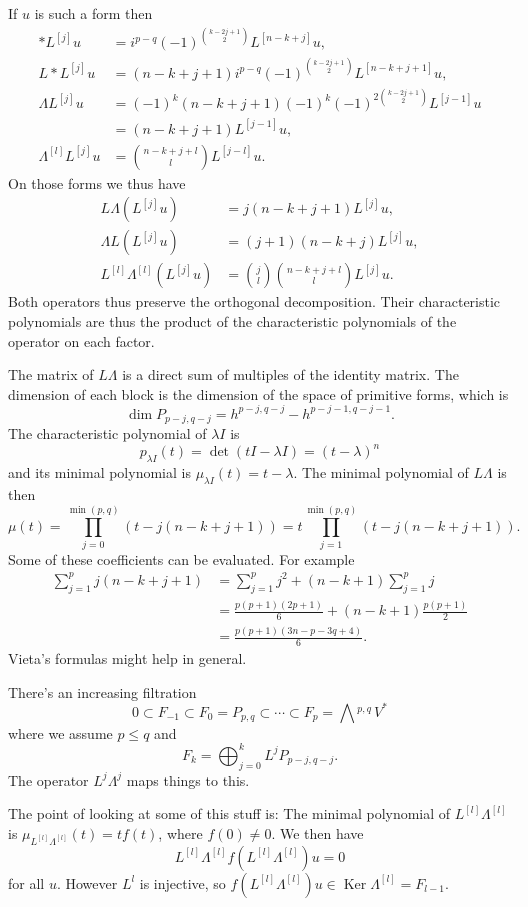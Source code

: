 \documentclass[11pt]{amsart}
\theoremstyle{definition}
\def\^#1{^{[#1]}}
\DeclareMathOperator{\Ker}{Ker}
\newcommand{\ext}[1]{\bigwedge{}^{\!\!#1}\,}
\begin{document}
If $u$ is such a form then
\begin{align*}
* L\^{j} u
&= i^{p-q} (-1)^{\binom{k-2j+1}{2}} L\^{n-k+j} u,
\\
L * L\^{j} u
&= (n-k+j+1) i^{p-q} (-1)^{\binom{k-2j+1}{2}} L\^{n-k+j+1} u,
\\
\Lambda L\^{j} u
&= (-1)^k (n-k+j+1) (-1)^k (-1)^{2 \binom{k-2j+1}{2}} L\^{j-1} u
\\
&= (n-k+j+1) L\^{j-1} u,
\\
\Lambda\^{l} L\^{j} u
&= \binom{n-k+j+l}{l} L\^{j-l} u.
\end{align*}
On those forms we thus have
\begin{align*}
L\Lambda(L\^j u)
&= j (n-k+j+1) L\^j u,
\\
\Lambda L (L\^j u)
&= (j+1) (n-k+j) L\^j u,
\\
L\^l \Lambda\^l (L\^j u)
&= \binom{j}{l} \binom{n-k+j+l}{l} L\^j u.
\end{align*}
Both operators thus preserve the orthogonal decomposition.
Their characteristic polynomials are thus the product of the characteristic
polynomials of the operator on each factor.

The matrix of $L\Lambda$ is a direct sum of multiples of the identity matrix.
The dimension of each block is the dimension of the space of primitive
forms, which is
$$
\dim P_{p-j,q-j} = h^{p-j,q-j} - h^{p-j-1,q-j-1}.
$$
The characteristic polynomial of $\lambda I$ is
$$
p_{\lambda I}(t)
= \det(t I - \lambda I)
= (t - \lambda)^n
$$
and its minimal polynomial is $\mu_{\lambda I}(t) = t - \lambda$.
The minimal polynomial of $L\Lambda$ is then
$$
\mu(t)
= \prod_{j=0}^{\min(p,q)} \!\!\! (t - j(n-k+j+1))
= t \!\!\! \prod_{j=1}^{\min(p,q)} \!\!\! (t - j(n-k+j+1)).
$$
Some of these coefficients can be evaluated. For example
\begin{align*}
\sum_{j=1}^p j(n-k+j+1)
&= \sum_{j=1}^p j^2 + (n-k+1) \sum_{j=1}^p j
\\
&= \frac{p(p+1)(2p+1)}{6} + (n-k+1) \frac{p(p+1)}{2}
\\
&= \frac{p(p+1)(3n-p-3q+4)}{6}.
\end{align*}
Vieta's formulas might help in general.


There's an increasing filtration
$$
0
\subset F_{-1}
\subset F_0 = P_{p,q}
\subset \cdots
\subset F_p = \ext{p,q} V^*
$$
where we assume $p \leq q$ and
$$
F_k = \bigoplus_{j=0}^k L^j P_{p-j,q-j}.
$$
The operator $L^j\Lambda^j$ maps things to this.

The point of looking at some of this stuff is:
The minimal polynomial of $L\^l\Lambda\^l$ is $\mu_{L\^l \Lambda\^l}(t) = t f(t)$,
where $f(0) \not= 0$.
We then have
$$
L\^l \Lambda\^l f(L\^l \Lambda\^l) u = 0
$$
for all $u$.
However $L^l$ is injective, so $f(L\^l \Lambda\^l) u \in \Ker \Lambda\^l =
F_{l-1}$.
\end{document}
